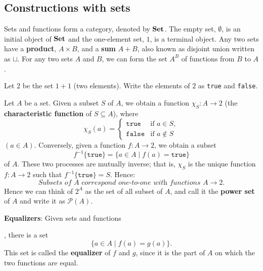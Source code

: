 \documentclass[11pt,a4paper]{article}
\begin{document}
\subsection{Constructions with sets}
Sets and functions form a category, denoted by $\mathbf{Set}$. The empty set, $\emptyset$, is an initial object of $\mathbf{Set}$ and the one-element set, $1$, is a terminal object. Any two sets have a \textbf{product}, $A\times B$, and a \textbf{sum} $A+B$, also known as disjoint union written as $\sqcup$. For any two sets $A$ and $B$, we can form the set $A^B$ of functions from $B$ to $A$.\par

Let $2$ be the set $1+1$ (two elements). Write the elements of $2$ as \texttt{true} and \texttt{false}.\par

Let $A$ be a set. Given a subset $S$ of $A$, we obtain a function $\chi_S:A\to 2$ (the \textbf{characteristic function} of $S\subseteq A$), where
\begin{equation*}
    \chi_S(a) = \begin{cases}
        \texttt{true} & \text{if } a\in S,\\
        \texttt{false} & \text{if } a\notin S
    \end{cases}
\end{equation*}
$(a\in A)$. Conversely, given a function $f:A\to 2$, we obtain a subset
\begin{equation*}
    f^{-1}\{\texttt{true}\} = \{a\in A\mid f(a)=\texttt{true}\}
\end{equation*}
of $A$. These two processes are mutually inverse; that is, $\chi_S$ is the unique function $f:A\to 2$ such that $f^{-1}\{\texttt{true}\}=S$. Hence:
\begin{equation*}
    \textit{Subsets of $A$ correspond one-to-one with functions } A\to 2.
\end{equation*}
Hence we can think of $2^A$ as the set of all subset of $A$, and call it the \textbf{power set} of $A$ and write it as $\mathcal{P}(A)$.\par

\bigskip\noindent\textbf{Equalizers}: Given sets and functions , there is a set
\begin{equation*}
    \{ a\in A\mid f(a)=g(a) \}.
\end{equation*}
This set is called the \textbf{equalizer} of $f$ and $g$, since it is the part of $A$ on which the two functions are equal.\par
\end{document}
